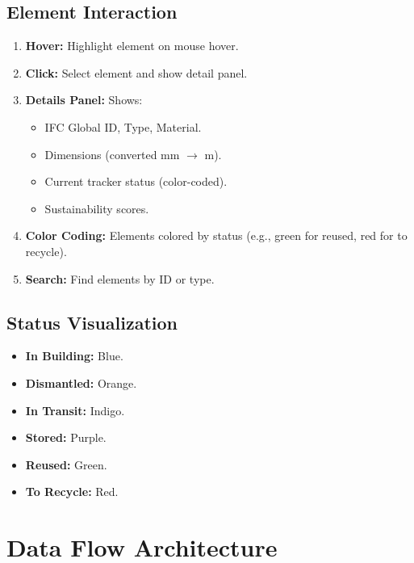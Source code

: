 \documentclass[11pt,a4paper]{article}
\begin{document}
\subsection{Element Interaction}

\begin{enumerate}[leftmargin=*]
    \item \textbf{Hover:} Highlight element on mouse hover.
    \item \textbf{Click:} Select element and show detail panel.
    \item \textbf{Details Panel:} Shows:
        \begin{itemize}
            \item IFC Global ID, Type, Material.
            \item Dimensions (converted mm $\rightarrow$ m).
            \item Current tracker status (color-coded).
            \item Sustainability scores.
        \end{itemize}
    \item \textbf{Color Coding:} Elements colored by status (e.g., green for reused, red for to recycle).
    \item \textbf{Search:} Find elements by ID or type.
\end{enumerate}

\subsection{Status Visualization}

\begin{itemize}
    \item \textbf{In Building:} Blue.
    \item \textbf{Dismantled:} Orange.
    \item \textbf{In Transit:} Indigo.
    \item \textbf{Stored:} Purple.
    \item \textbf{Reused:} Green.
    \item \textbf{To Recycle:} Red.
\end{itemize}

\section{Data Flow Architecture}
\end{document}
